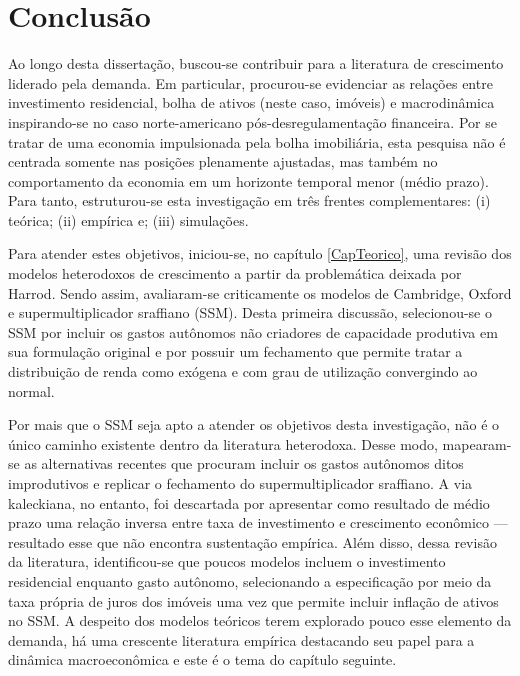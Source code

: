 \chapter{Conclusão}

Ao longo desta dissertação, buscou-se contribuir para a literatura de crescimento liderado pela demanda.
Em particular, procurou-se evidenciar as relações entre investimento residencial, bolha de ativos (neste caso, imóveis) e macrodinâmica inspirando-se no caso norte-americano pós-desregulamentação financeira.
Por se tratar de uma economia impulsionada pela bolha imobiliária, esta pesquisa não é centrada somente nas posições plenamente ajustadas, mas também no comportamento da economia em um horizonte temporal menor (médio prazo).
Para tanto, estruturou-se esta investigação em três frentes complementares: (i) teórica; (ii) empírica e; (iii) simulações.



Para atender estes objetivos, iniciou-se, no capítulo \ref{CapTeorico}, uma revisão dos modelos heterodoxos de crescimento a partir da problemática deixada por Harrod.
Sendo assim, avaliaram-se criticamente os modelos de Cambridge, Oxford e supermultiplicador sraffiano (SSM).
Desta primeira discussão, selecionou-se o SSM por incluir os gastos autônomos não criadores de capacidade produtiva em sua formulação original e por possuir um fechamento que permite tratar a distribuição de renda como exógena e com grau de utilização convergindo ao normal.


Por mais que o SSM seja apto a atender os objetivos desta investigação, não é o único caminho existente dentro da literatura heterodoxa.
Desse modo, mapearam-se as alternativas recentes que procuram incluir os gastos autônomos ditos improdutivos e replicar o fechamento do supermultiplicador sraffiano.
A via kaleckiana, no entanto, foi descartada por apresentar como resultado de médio prazo uma relação inversa entre taxa de investimento e crescimento econômico --- resultado esse que não encontra sustentação empírica. 
Além disso, dessa revisão da literatura, identificou-se que poucos modelos incluem o investimento residencial enquanto gasto autônomo, selecionando a especificação por meio  da taxa própria de juros dos imóveis uma vez que permite incluir inflação de ativos no  SSM.
A despeito dos modelos teóricos terem explorado pouco
esse elemento da demanda, há uma crescente literatura empírica destacando seu papel para a dinâmica macroeconômica e este é o tema do capítulo seguinte.


